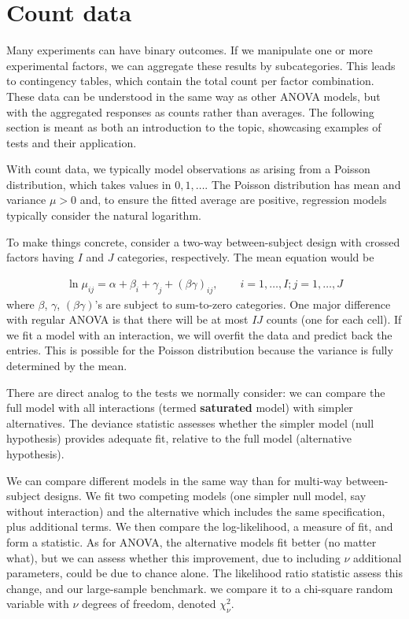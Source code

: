 \documentclass[
  11pt,
  letterpaper,
]{scrbook}
\theoremstyle{definition}
\theoremstyle{definition}
\theoremstyle{remark}
\begin{document}

\chapter{Count data}\label{count-data}

Many experiments can have binary outcomes. If we manipulate one or more
experimental factors, we can aggregate these results by subcategories.
This leads to contingency tables, which contain the total count per
factor combination. These data can be understood in the same way as
other ANOVA models, but with the aggregated responses as counts rather
than averages. The following section is meant as both an introduction to
the topic, showcasing examples of tests and their application.

With count data, we typically model observations as arising from a
Poisson distribution, which takes values in \(0, 1, \ldots\). The
Poisson distribution has mean and variance \(\mu>0\) and, to ensure the
fitted average are positive, regression models typically consider the
natural logarithm.

To make things concrete, consider a two-way between-subject design with
crossed factors having \(I\) and \(J\) categories, respectively. The
mean equation would be

\begin{align*}
\ln \mu_{ij} = \alpha + \beta_i + \gamma_j + (\beta\gamma)_{ij}, \qquad i=1,\ldots, I; j =1, \ldots, J
\end{align*} where \(\beta\), \(\gamma\), \((\beta\gamma)\)'s are
subject to sum-to-zero categories. One major difference with regular
ANOVA is that there will be at most \(IJ\) counts (one for each cell).
If we fit a model with an interaction, we will overfit the data and
predict back the entries. This is possible for the Poisson distribution
because the variance is fully determined by the mean.

There are direct analog to the tests we normally consider: we can
compare the full model with all interactions (termed \textbf{saturated}
model) with simpler alternatives. The deviance statistic assesses
whether the simpler model (null hypothesis) provides adequate fit,
relative to the full model (alternative hypothesis).

We can compare different models in the same way than for multi-way
between-subject designs. We fit two competing models (one simpler null
model, say without interaction) and the alternative which includes the
same specification, plus additional terms. We then compare the
log-likelihood, a measure of fit, and form a statistic. As for ANOVA,
the alternative models fit better (no matter what), but we can assess
whether this improvement, due to including \(\nu\) additional
parameters, could be due to chance alone. The likelihood ratio statistic
assess this change, and our large-sample benchmark. we compare it to a
chi-square random variable with \(\nu\) degrees of freedom, denoted
\(\chi^2_\nu\).
\end{document}
